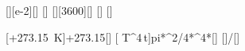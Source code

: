 [\centi\meter][e-2][\meter]
[\degreeCelsius]
[\hour][3600][\second]
[\Wpqmkv]
[\meter\kelvin]

[\vartheta+\SI{273.15}{\kelvin}]{\tPX+273.15}[\kelvin]
[\sigma\,\,T^4\,t]{\sigX*pi*\dPX^2/4*\TPX^4*\tSX}[\joule]
[]{\bWX/\TPX}[\meter]
